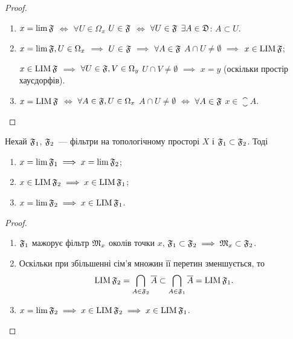 \begin{proof}
    \listhack
    \begin{enumerate}
        \item $x = \lim \frak F$ $\iff$ $\forall U \in \Omega_x$ $U \in \frak F$ $\iff$ $\forall U \in \frak F$ $\exists A \in \frak D$: $A \subset U$.

        \item $x = \lim \frak F, U \in \Omega_x$ $\implies$ $U \in \frak F$ $\implies$ $\forall A \in \frak F$ $A \cap U \ne \emptyset$ $\implies$ $x \in \LIM \frak F$;
        
        $x \in \LIM \frak F$ $\implies$ $\forall U \in \frak F, V \in \Omega_y$ $U \cap V \ne \emptyset$ $\implies$ $x = y$ (оскільки простір хаусдорфів).

        \item $x = \LIM \frak F$ $\iff$ $\forall A \in \frak F, U \in \Omega_x$ $A \cap U \ne \emptyset$ $\iff$ $\forall A \in \frak F$ $x \in \closure A$. \qedhere
    \end{enumerate}
\end{proof}

\begin{theorem}
    Нехай $\frak F_1$, $\frak F_2$~--- фільтри на топологічному просторі $X$ і $\frak F_1 \subset \frak F_2$. Тоді
    \begin{enumerate}
        \item $x = \lim \frak F_1 \implies x = \lim \frak F_2$;
        \item $x \in \LIM \frak F_2 \implies x \in \LIM \frak F_1$;
        \item $x = \lim \frak F_2 \implies x \in \LIM \frak F_1$.
    \end{enumerate}
\end{theorem}

\begin{proof}
    \listhack
    \begin{enumerate}
        \item $\frak F_1$ мажорує фільтр $\frak M_x$ околів точки $x$, $\frak F_1 \subset \frak F_2 \implies \frak M_x \subset \frak F_2$.

        \item Оскільки при збільшенні сім'я множин її перетин зменшується, то
        \begin{equation}
            \LIM \frak F_2 = \bigcap_{A \in \frak F_2} \closure A \subset \bigcap_{A \in \frak F_1} \closure A = \LIM \frak F_1.
        \end{equation}

        \item $x = \lim \frak F_2 \implies x \in \LIM \frak F_2 \implies x \in \LIM \frak F_1$. 
    \end{enumerate}
\end{proof}

